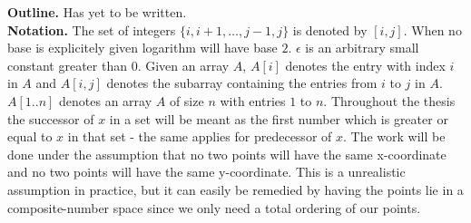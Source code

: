 \noindent \textbf{Outline.} Has yet to be written. \\

\noindent \textbf{Notation.} The set of integers $\{i, i+1, \dots, j-1, j\}$ is denoted by $[i,j]$. When no base is explicitely given logarithm will have base $2$. $\epsilon$ is an arbitrary small constant greater than $0$. Given an array $A$, $A[i]$ denotes the entry with index $i$ in $A$ and $A[i,j]$ denotes the subarray containing the entries from $i$ to $j$ in $A$. $A[1..n]$ denotes an array $A$ of size $n$ with entries $1$ to $n$. Throughout the thesis the successor of $x$ in a set will be meant as the first number which is greater or equal to $x$ in that set - the same applies for predecessor of $x$. The work will be done under the assumption that no two points will  have the same x-coordinate and no two points will have the same y-coordinate. This is a unrealistic assumption in practice, but it can easily be remedied by having the points lie in a composite-number space since we only need a total ordering of our points.



